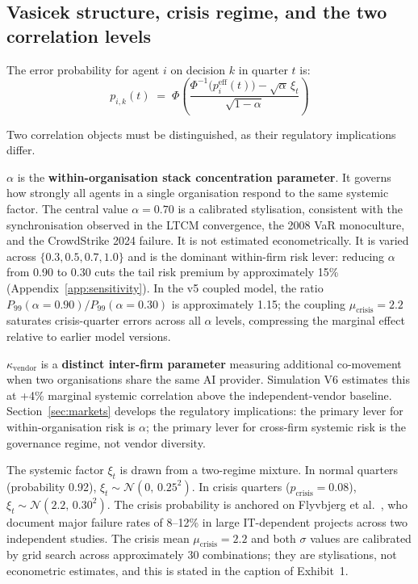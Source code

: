 \documentclass[11pt,a4paper]{article}
\begin{document}
\subsection{Vasicek structure, crisis regime, and the two correlation levels}

The error probability for agent $i$ on decision $k$ in quarter $t$ is:
\[
  p_{i,k}(t) \;=\;
  \Phi\!\left(
    \frac{\Phi^{-1}\!\bigl(p_i^{\text{eff}}(t)\bigr)
          - \sqrt{\alpha}\,\xi_t}
         {\sqrt{1-\alpha}}
  \right)
\]

Two correlation objects must be distinguished, as their regulatory
implications differ.

$\alpha$ is the \textbf{within-organisation stack concentration parameter}.
It governs how strongly all agents in a single organisation respond to the
same systemic factor. The central value $\alpha = 0.70$ is a calibrated
stylisation, consistent with the synchronisation observed in the LTCM
convergence, the 2008 VaR monoculture, and the CrowdStrike 2024 failure. It
is not estimated econometrically. It is varied across $\{0.3, 0.5, 0.7,
1.0\}$ and is the dominant within-firm risk lever: reducing $\alpha$ from 0.90 to 0.30 cuts the tail risk premium by
approximately 15\% (Appendix~\ref{app:sensitivity}). In the v5 coupled
model, the ratio $P_{99}(\alpha{=}0.90)/P_{99}(\alpha{=}0.30)$ is
approximately 1.15; the coupling $\mu_{\text{crisis}} = 2.2$ saturates
crisis-quarter errors across all $\alpha$ levels, compressing the
marginal effect relative to earlier model versions.

$\kappa_{\text{vendor}}$ is a \textbf{distinct inter-firm parameter}
measuring additional co-movement when two organisations share the same AI
provider. Simulation V6 estimates this at +4\% marginal systemic correlation
above the independent-vendor baseline. Section~\ref{sec:markets} develops
the regulatory implications: the primary lever for within-organisation risk
is $\alpha$; the primary lever for cross-firm systemic risk is the governance
regime, not vendor diversity.

The systemic factor $\xi_t$ is drawn from a two-regime mixture. In normal
quarters (probability 0.92),
$\xi_t \sim \mathcal{N}(0,\, 0.25^2)$. In crisis quarters
($p_{\text{crisis}} = 0.08$),
$\xi_t \sim \mathcal{N}(2.2,\, 0.30^2)$. The crisis probability is
anchored on Flyvbjerg et al.~\cite{flyvbjerg_jmis_2022,flyvbjerg_pmj_2025}, who document major
failure rates of 8--12\% in large IT-dependent projects across two
independent studies. The crisis mean $\mu_{\text{crisis}} = 2.2$ and both
$\sigma$ values are calibrated by grid search across approximately 30
combinations; they are stylisations, not econometric estimates, and this is
stated in the caption of Exhibit~1.
\end{document}
